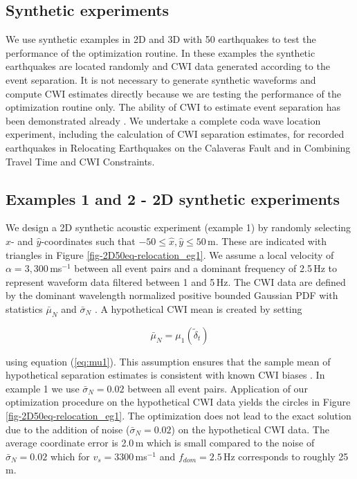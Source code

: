 \documentclass[12pt,double]{article}
\begin{document}
\vspace{2em}
\begin{centering}
\section*{Synthetic experiments}
\end{centering}

\label{sec:benchmarking}

We use synthetic examples in 2D and 3D with 50 earthquakes to test
the performance of the optimization routine. In these examples the
synthetic earthquakes are located randomly and CWI data generated
according to the event separation. It is not necessary to generate
synthetic waveforms and compute CWI estimates directly because we
are testing the performance of the optimization routine only. The
ability of CWI to estimate event separation has been demonstrated
already \citep{dr_Snieder05a, dr_Robinson07b, dr_Robinson11a}. We
undertake a complete coda wave location experiment, including the
calculation of CWI separation estimates, for recorded earthquakes in 
Relocating Earthquakes on the Calaveras 
Fault and in Combining Travel Time and CWI Constraints.

\vspace{1em}
\subsection*{Examples 1 and 2 - 2D synthetic experiments}

We design a 2D synthetic acoustic experiment (example 1) by randomly
selecting $\hat{x}$- and $\hat{y}$-coordinates such that $-50 \leq
\hat{x}, \hat{y} \leq 50$\,m. These are indicated with triangles in
Figure \ref{fig-2D50eq-relocation_eg1}.
 We assume a local velocity of $\alpha=3,300\,$ms$^{-1}$ between all
event pairs and a dominant frequency of 2.5$\,$Hz to represent
waveform data filtered between 1 and 5$\,$Hz. The CWI data are
defined by the dominant wavelength normalized positive bounded
Gaussian PDF with statistics $\bar{\mu}_N$ and $\bar{\sigma}_N$
\citep{dr_Robinson11a}. A hypothetical CWI mean is created by
setting
\begin{linenomath*} \begin{equation} 
\label{eq:hypothetical-CWI-mean-optichapt}
\bar{\mu}_N = \mu_1 \left( \widetilde{\delta}_t \right)
\end{equation} \end{linenomath*}
using equation (\ref{eq:mu1}). This assumption ensures that the
sample mean of hypothetical separation estimates is consistent with
known CWI biases \citep{dr_Robinson11a}. In example 1 we use
$\bar{\sigma}_N=0.02$ between all event pairs. Application of our
optimization procedure on the hypothetical CWI data yields the
circles in Figure \ref{fig-2D50eq-relocation_eg1}. The optimization
does not lead to the exact solution due to the addition of noise
($\bar{\sigma}_N=0.02$) on the hypothetical CWI data. The average
coordinate error is 2.0\,m which is small compared to the noise of
$\bar{\sigma}_N=0.02$ which for $v_s=3300$\,ms$^{-1}$ and
$f_{dom}=2.5$\,Hz corresponds to roughly 25\,m.
\end{document}
